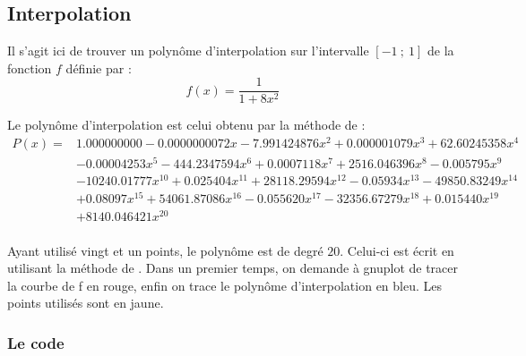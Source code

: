 \subsection{Interpolation}

Il s'agit ici de trouver un polynôme d'interpolation sur l'intervalle $[-1~;~1]$ de la fonction $f$ définie par :
\[
  f(x)=\frac{1}{1+8x^2}
\]

Le polynôme d'interpolation est celui obtenu par la méthode de  :
\begin{equation*}
\begin{split}
 P(x) = &1.000000000-0.0000000072x-7.991424876x^2+0.000001079x^3+62.60245358x^4\\
 & -0.00004253x^5-444.2347594x^6+0.0007118x^7+ 2516.046396x^8 -0.005795x^9\\ &-10240.01777x^{10} +0.025404x^{11}+28118.29594x^{12} -0.05934x^{13} -49850.83249x^{14} \\
& +0.08097x^{15}+54061.87086x^{16} -0.055620x^{17} -32356.67279x^{18} +0.015440x^{19}\\
&+8140.046421x^{20}\\
\end{split}
\end{equation*}

Ayant utilisé vingt et un points, le polynôme est de degré $20$. Celui-ci est écrit en utilisant la méthode de . Dans un premier temps, on demande à gnuplot de tracer la courbe de f en rouge,  enfin on trace le polynôme d'interpolation en bleu. Les points utilisés sont en jaune.

\subsubsection{Le code}
\begin{tkzexample}
\end{tkzexample}


